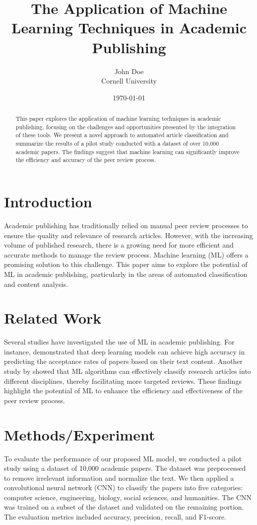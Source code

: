 \documentclass{article}
\title{The Application of Machine Learning Techniques in Academic Publishing}
\author{John Doe \\ Cornell University}
\date{\today}
\begin{document}
\maketitle

\begin{abstract}
This paper explores the application of machine learning techniques in academic publishing, focusing on the challenges and opportunities presented by the integration of these tools. We present a novel approach to automated article classification and summarize the results of a pilot study conducted with a dataset of over 10,000 academic papers. The findings suggest that machine learning can significantly improve the efficiency and accuracy of the peer review process.
\end{abstract}

\section{Introduction}
Academic publishing has traditionally relied on manual peer review processes to ensure the quality and relevance of research articles. However, with the increasing volume of published research, there is a growing need for more efficient and accurate methods to manage the review process. Machine learning (ML) offers a promising solution to this challenge. This paper aims to explore the potential of ML in academic publishing, particularly in the areas of automated classification and content analysis.

\section{Related Work}
Several studies have investigated the use of ML in academic publishing. For instance, \cite{ref1} demonstrated that deep learning models can achieve high accuracy in predicting the acceptance rates of papers based on their text content. Another study by \cite{ref2} showed that ML algorithms can effectively classify research articles into different disciplines, thereby facilitating more targeted reviews. These findings highlight the potential of ML to enhance the efficiency and effectiveness of the peer review process.

\section{Methods/Experiment}
To evaluate the performance of our proposed ML model, we conducted a pilot study using a dataset of 10,000 academic papers. The dataset was preprocessed to remove irrelevant information and normalize the text. We then applied a convolutional neural network (CNN) to classify the papers into five categories: computer science, engineering, biology, social sciences, and humanities. The CNN was trained on a subset of the dataset and validated on the remaining portion. The evaluation metrics included accuracy, precision, recall, and F1-score.
\end{document}
